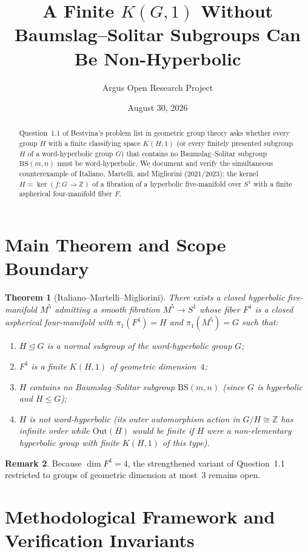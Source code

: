 \documentclass[10pt,reqno]{amsart}
\title[A Finite $K(G,1)$ Without Baumslag--Solitar Subgroups Can Be Non-Hyperbolic]
{A Finite $K(G,1)$ Without Baumslag--Solitar Subgroups Can Be Non-Hyperbolic}
\author{Argus Open Research Project}
\date{August 30, 2026}
\newtheorem{theorem}{Theorem}[section]
\theoremstyle{definition}
\newtheorem{remark}[theorem]{Remark}
\begin{document}
\begin{abstract}
Question~1.1 of Bestvina's problem list in geometric group theory asks whether every group $H$ with a finite classifying space $K(H,1)$ (or every finitely presented subgroup $H$ of a word-hyperbolic group $G$) that contains no Baumslag--Solitar subgroup $\mathrm{BS}(m,n)$ must be word-hyperbolic. We document and verify the simultaneous counterexample of Italiano, Martelli, and Migliorini (2021/2023): the kernel $H=\ker(f:G\to\mathbb{Z})$ of a fibration of a hyperbolic five-manifold over $S^1$ with a finite aspherical four-manifold fiber $F$.
\end{abstract}
\maketitle
\section{Main Theorem and Scope Boundary}
\begin{theorem}[Italiano--Martelli--Migliorini]
There exists a closed hyperbolic five-manifold $M^5$ admitting a smooth fibration $M^5\to S^1$ whose fiber $F^4$ is a closed aspherical four-manifold with $\pi_1(F^4)=H$ and $\pi_1(M^5)=G$ such that:
\begin{enumerate}[label=\textup{(\arabic*)}]
  \item $H\trianglelefteq G$ is a normal subgroup of the word-hyperbolic group $G$;
  \item $F^4$ is a finite $K(H,1)$ of geometric dimension~$4$;
  \item $H$ contains no Baumslag--Solitar subgroup $\mathrm{BS}(m,n)$ (since $G$ is hyperbolic and $H\le G$);
  \item $H$ is not word-hyperbolic (its outer automorphism action in $G/H\cong\mathbb{Z}$ has infinite order while $\mathrm{Out}(H)$ would be finite if $H$ were a non-elementary hyperbolic group with finite $K(H,1)$ of this type).
\end{enumerate}
\end{theorem}
\begin{remark}
Because $\dim F^4=4$, the strengthened variant of Question~1.1 restricted to groups of geometric dimension at most~$3$ remains open.
\end{remark}

\section{Methodological Framework and Verification Invariants}
\end{document}
